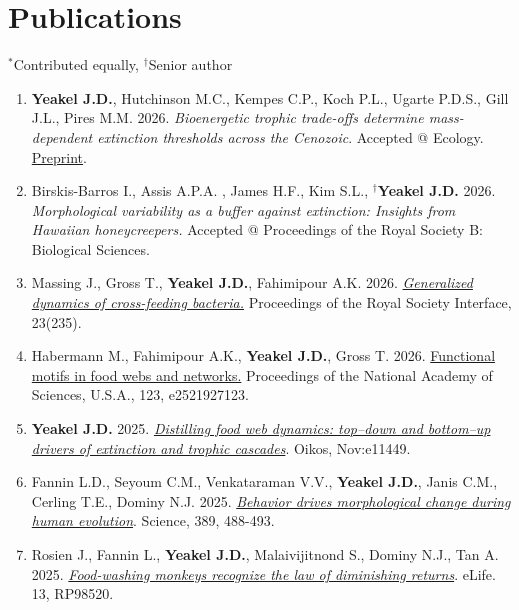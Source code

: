 \documentclass[margin,line,12pt]{res}
\newcommand\reverselabel[1]{%
  \def\theenumi{}%
  \renewcommand\makelabel{\makebox[\dimexpr\labelwidth-3pt\relax][r]{%
    \the\numexpr#1-\value{enumi}+1\relax}}}%
\begin{document}
\begin{resume}
\begin{enumerate}
\end{enumerate}


\section{\sc Publications}
{\footnotesize{${}^\ast$Contributed equally, ${}^\dag$Senior author}}
\begin{enumerate}
  \reverselabel{48}

\item \textbf{Yeakel J.D.}, Hutchinson M.C., Kempes C.P., Koch P.L., Ugarte P.D.S., Gill J.L., Pires M.M. 2026. \emph{Bioenergetic trophic trade-offs determine mass-dependent extinction thresholds across the Cenozoic}. Accepted @ Ecology. \href{http://arxiv.org/abs/2410.18849}{Preprint}.

\item Birskis-Barros I., Assis A.P.A. , James H.F., Kim S.L., \textbf{${}^\dag$Yeakel J.D.} 2026. \emph{Morphological variability as a buffer against extinction: Insights from Hawaiian honeycreepers.} Accepted @ Proceedings of the Royal Society B: Biological Sciences.

\item Massing J., Gross T., \textbf{Yeakel J.D.}, Fahimipour A.K. 2026. \href{https://royalsocietypublishing.org/rsif/article/23/235/20250437/480510}{\emph{Generalized dynamics of cross-feeding bacteria.}} Proceedings of the Royal Society Interface, 23(235).

\item Habermann M., Fahimipour A.K., \textbf{Yeakel J.D.}, Gross T. 2026. \href{https://www.pnas.org/doi/abs/10.1073/pnas.2521927123}{Functional motifs in food webs and networks.} Proceedings of the National Academy of Sciences, U.S.A., 123, e2521927123.

\item \textbf{Yeakel J.D.} 2025. \href{https://nsojournals.onlinelibrary.wiley.com/doi/abs/10.1002/oik.11449}{\emph{Distilling food web dynamics: top–down and bottom–up drivers of extinction and trophic cascades}}. Oikos, Nov:e11449.

\item Fannin L.D., Seyoum C.M., Venkataraman V.V., \textbf{Yeakel J.D.}, Janis C.M., Cerling T.E., Dominy N.J. 2025. \href{https://www.science.org/doi/10.1126/science.ado2359}{\emph{Behavior drives morphological change during human evolution}}. Science, 389, 488-493.

\item Rosien J., Fannin L., \textbf{Yeakel J.D.}, Malaivijitnond S., Dominy N.J., Tan A. 2025. \href{https://elifesciences.org/articles/98520}{\emph{Food-washing monkeys recognize the law of diminishing returns}}. eLife. 13, RP98520.


\end{enumerate}
\end{resume}
\end{document}
